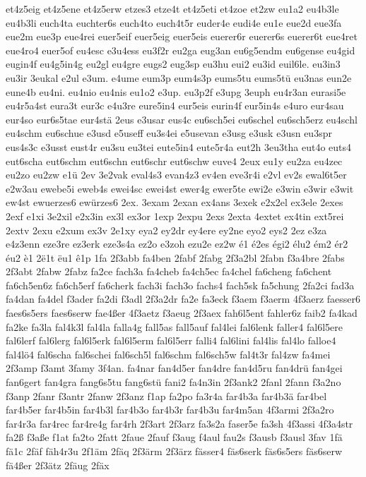 {et4z5eig
et4z5ene
et4z5erw
etzes3
etze4t
et4z5eti
et4zoe
et2zw
eu1a2
eu4b3le
eu4b3li
euch4ta
euchter6s
euch4to
euch4t5r
euder4e
eudi4e
eu1e
eue2d
eue3fa
eue2m
eue3p
eue4rei
euer5eif
euer5eig
euer5eis
euerer6r
euerer6s
euerer6t
eue4ret
eue4ro4
euer5of
eu4esc
e3u4ess
eu3f2r
eu2ga
eug3an
eu6g5endm
eu6gense
eu4gid
eugin4f
eu4g5in4g
eu2gl
eu4gre
eugs2
eug3sp
eu3hu
eui2
eu3id
euil6le.
eu3in3
eu3ir
3eukal
e2ul
e3um.
e4ume
eum3p
eum4s3p
eums5tu
eums5tü
eu3nas
eun2e
eune4b
eu4ni.
eu4nio
eu4nis
eu1o2
e3up.
eu3p2f
e3upg
3euph
eu4r3an
eurasi5e
eu4r5a4st
eura3t
eur3c
e4u3re
eure5in4
eur5eis
eurin4f
eur5in4s
e4uro
eur4sau
eur4so
eur6s5tae
eur4stä
2eus
e3usar
eus4c
eu6sch5ei
eu6schel
eu6sch5erz
eu4schl
eu4schm
eu6schue
e3usd
e5useff
eu3s4ei
e5usevan
e3usg
e3usk
e3usn
eu3spr
eus4s3c
e3usst
eust4r
eu3su
eu3tei
eute5in4
eute5r4a
eut2h
3eu3tha
eut4o
euts4
eut6scha
eut6schm
eut6schn
eut6schr
eut6schw
euve4
2eux
eu1y
eu2za
eu4zec
eu2zo
eu2zw
e1ü
2ev
3e2vak
eval4s3
evan4z3
ev4en
eve3r4i
e2vl
ev2s
ewal6t5er
e2w3au
ewebe5i
eweb4s
ewei4sc
ewei4st
ewer4g
ewer5te
ewi2e
e3win
e3wir
e3wit
ew4st
ewuerzes6
ewürzes6
2ex.
3exam
2exan
ex4ans
3exek
e2x2el
ex3ele
2exes
2exf
e1xi
3e2xil
e2x3in
ex3l
ex3or
1exp
2expu
2exs
2exta
4extet
ex4tin
ext5rei
2extv
2exu
e2xum
ex3v
2e1xy
eya2
ey2dr
ey4ere
ey2ne
eyo2
eys2
2ez
e3za
e4z3enn
eze3re
ez3erk
eze3s4a
ez2o
e3zoh
ezu2e
ez2w
é1
é2es
égi2
élu2
ém2
ér2
éu2
è1
2ë1t
ëu1
ê1p
1fa
2f3abb
fa4ben
2fabf
2fabg
2f3a2bl
2fabn
f3a4bre
2fabs
2f3abt
2fabw
2fabz
fa2ce
fach3a
fa4cheb
fa4ch5ec
fa4chel
fa6cheng
fa6chent
fa6ch5en6z
fa6ch5erf
fa6cherk
fach3i
fach3o
fachs4
fach5sk
fa5chung
2fa2ci
fad3a
fa4dan
fa4del
f3ader
fa2di
f3adl
2f3a2dr
fa2e
fa3eck
f3aem
f3aerm
4f3aerz
faesser6
faes6s5ers
faes6serw
fae4ßer
4f3aetz
f3aeug
2f3aex
fah6l5ent
fahler6z
faib2
fa4kad
fa2ke
fa3la
fal4k3l
fal4la
falla4g
fall5as
fall5auf
fal4lei
fal6lenk
faller4
fal6l5ere
fal6lerf
fal6lerg
fal6l5erk
fal6l5erm
fal6l5err
falli4
fal6lini
fal4lis
fal4lo
falloe4
fal4lö4
fal6scha
fal6schei
fal6sch5l
fal6schm
fal6sch5w
fal4t3r
fal4zw
fa4mei
2f3amp
f3amt
3famy
3f4an.
fa4nar
fan4d5er
fan4dre
fan4d5ru
fan4drü
fan4gei
fan6gert
fan4gra
fang6s5tu
fang6stü
fani2
fa4n3in
2f3ank2
2fanl
2fann
f3a2no
f3anp
2fanr
f3antr
2fanw
2f3anz
f1ap
fa2po
fa3r4a
far4b3a
far4b3ä
far4bel
far4b5er
far4b5in
far4b3l
far4b3o
far4b3r
far4b3u
far4m5an
4f3armi
2f3a2ro
far4r3a
far4rec
far4re4g
far4rh
2f3art
2f3arz
fa3s2a
faser5e
fa3sh
4f3assi
4f3a4str
fa2ß
f3aße
f1at
fa2to
2fatt
2faue
2fauf
f3aug
f4aul
fau2s
f3ausb
f3ausl
3fav
1fä
fä1c
2fäf
fäh4r3u
2f1äm
2fäq
2f3ärm
2f3ärz
fässer4
fäs6serk
fäs6s5ers
fäs6serw
fä4ßer
2f3ätz
2fäug
2fäx
}
